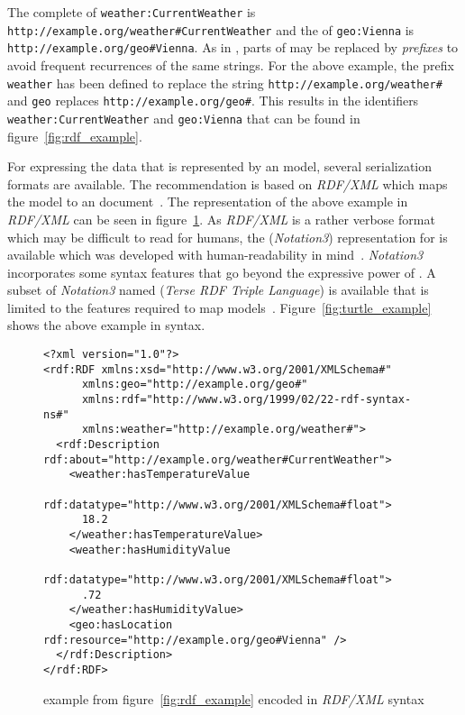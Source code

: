 The complete  of \texttt{weather:\hspace{0pt}Current\hspace{0pt}Weather} is \texttt{http://example.org/\hspace{0pt}weather\#\hspace{0pt}CurrentWeather} and the  of \texttt{geo:\hspace{0pt}Vienna} is \texttt{http://example.org/geo\#Vienna}. As in , parts of  may be replaced by \emph{prefixes} to avoid frequent recurrences of the same strings. For the above example, the prefix \texttt{weather} has been defined to replace the string \texttt{http://example.org/weather\#} and \texttt{geo} replaces \texttt{http://example.org/geo\#}. This results in the identifiers \texttt{weather:CurrentWeather} and \texttt{geo:Vienna} that can be found in figure~\ref{fig:rdf_example}.

For expressing the data that is represented by an  model, several serialization formats are available. The  recommendation is based on \emph{RDF/XML} which maps the  model to an  document~\cite{RDF_XML}. The representation of the above example in \emph{RDF/XML} can be seen in figure~\ref{fig:rdfxml_example}. As \emph{RDF/XML} is a rather verbose format which may be difficult to read for humans, the  (\emph{Notation3}) representation for  is available which was developed with human-readability in mind~\cite{Notation3}. \emph{Notation3} incorporates some syntax features that go beyond the expressive power of . A subset of \emph{Notation3} named  (\emph{Terse RDF Triple Language}) is available that is limited to the features required to map  models~\cite{Turtle}. Figure~\ref{fig:turtle_example} shows the above example in  syntax.

\begin{figure} %
\begin{lstlisting}
<?xml version="1.0"?>
<rdf:RDF xmlns:xsd="http://www.w3.org/2001/XMLSchema#"
      xmlns:geo="http://example.org/geo#"
      xmlns:rdf="http://www.w3.org/1999/02/22-rdf-syntax-ns#"
      xmlns:weather="http://example.org/weather#">
  <rdf:Description rdf:about="http://example.org/weather#CurrentWeather">
    <weather:hasTemperatureValue
	  rdf:datatype="http://www.w3.org/2001/XMLSchema#float">
      18.2
    </weather:hasTemperatureValue>
    <weather:hasHumidityValue
	  rdf:datatype="http://www.w3.org/2001/XMLSchema#float">
      .72
    </weather:hasHumidityValue>
    <geo:hasLocation rdf:resource="http://example.org/geo#Vienna" />
  </rdf:Description>
</rdf:RDF>
\end{lstlisting}
\caption{ example from figure~\ref{fig:rdf_example} encoded in \emph{RDF/XML} syntax}
\label{fig:rdfxml_example}
\end{figure}


